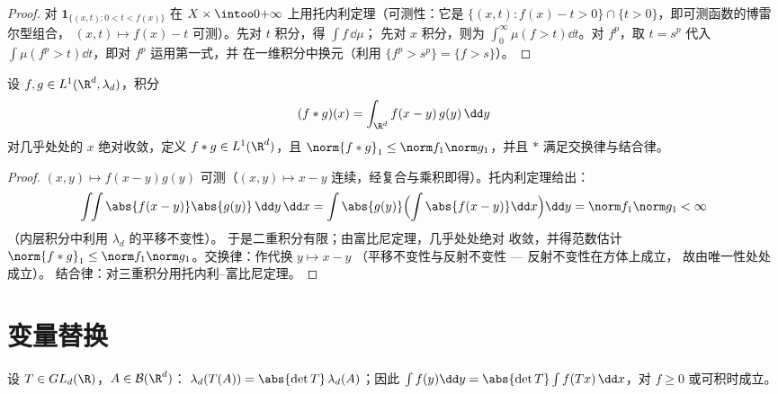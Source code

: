 \begin{proof}
对 $\mathbf 1_{\{(x,t) : 0 < t < f(x)\}}$ 在 $X
\times \intoo0{+\infty}$ 上用托内利定理（可测性：它是 $\{(x,t): f(x) - t
> 0\}\cap\{t > 0\}$，即可测函数的博雷尔型组合，
$(x,t)\mapsto f(x) - t$ 可测）。先对 $t$ 积分，得 $\int f\,\dd\mu$；
先对 $x$ 积分，则为 $\int_0^\infty\mu(f >
t)\dd t$。对 $f^p$，取 $t = s^p$ 代入 $\int\mu(f^p > t)
\dd t$，即对 $f^p$ 运用第一式，并
在一维积分中换元（利用 $\{f^p > s^p\} =
\{f > s\}$）。
\end{proof}

\begin{theorem}[$L^1$ 上的卷积]\label{thm:b3:product:convolution}
设 $f, g \in L^1(\R^d, \lambda_d)$，积分
\[
(f * g)(x) = \int_{\R^d} f(x - y)\,g(y)\,\dd y
\]
对几乎处处的 $x$ 绝对收敛，定义 $f * g \in
L^1(\R^d)$，且 $\norm{f*g}_1 \leq \norm f_1\norm g_1$，并且
$*$ 满足交换律与结合律。
\end{theorem}

\begin{proof}
$(x, y) \mapsto f(x-y)g(y)$ 可测（$ (x,y)\mapsto x -
y$ 连续，经复合与乘积即得）。托内利定理给出：
\[
\int\!\!\int \abs{f(x-y)}\abs{g(y)}\,\dd y\,\dd x
= \int\abs{g(y)}\Bigl(\int\abs{f(x - y)}\dd x\Bigr)\dd y
= \norm f_1\norm g_1 < \infty
\]
（内层积分中利用 $\lambda_d$ 的平移不变性）。
于是二重积分有限；由富比尼定理，几乎处处绝对
收敛，并得范数估计 $\norm{f*g}_1 \leq \norm
f_1\norm g_1$。交换律：作代换 $y \mapsto x - y$
（平移不变性与反射不变性 --- 反射不变性在方体上成立，
故由唯一性处处成立）。
结合律：对三重积分用托内利--富比尼定理。
\end{proof}

\section{变量替换}

\begin{theorem}[线性变量替换]
\label{thm:b3:product:linearchange}
设 $T \in GL_d(\R)$，$A \in \mathcal B(\R^d)$：
$\lambda_d(T(A)) = \abs{\det T}\,\lambda_d(A)$；因此
$\int f(y)\dd y = \abs{\det T}\int f(Tx)\,\dd x$，对 $f \geq 0$
或可积时成立。
\end{theorem}

